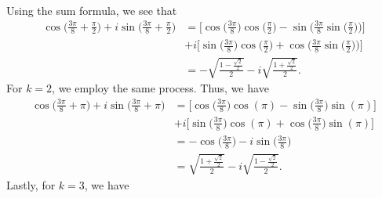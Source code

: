 \documentclass[a4paper]{article}
\begin{document}
\begin{enumerate}
\begin{solution}
\begin{align*}
                \end{align*}
                Using the sum formula, we see that 
                \begin{align*}
                    \cos \Big(  \frac{ 3 \pi  }{ 8  } + \frac{ \pi }{ 2 }  \Big) + i \sin \Big(  \frac{ 3 \pi }{ 8 }  + \frac{ \pi }{ 2 }  \Big) &= \Big[ \cos \Big(  \frac{ 3 \pi  }{ 8 }  \Big) \cos \Big(  \frac{  \pi  }{  2  }  \Big) - \sin \Big(  \frac{ 3 \pi  }{ 8  }  \sin \Big(  \frac{ \pi }{ 2 }  \Big) \Big)\Big]   \\
                                                                                                                                                 &+ i \Big[ \sin \Big(  \frac{ 3 \pi  }{ 8 }  \Big) \cos \Big(  \frac{  \pi  }{ 2 }  \Big) + \cos \Big(  \frac{  3 \pi  }{ 8  }  \sin \Big(  \frac{ \pi }{ 2 }  \Big) \Big) \Big] \\
                                                                                                                                                 &= - \sqrt{  \frac{ 1 - \frac{ \sqrt{ 2 }  }{ 2 }  }{ 2 }  }  - i \sqrt{ \frac{ 1 + \frac{ \sqrt{ 2 }  }{ 2 }  }{ 2 }   }.   
                \end{align*}
                For \( k = 2  \), we employ the same process. Thus, we have
                \begin{align*}
                    \cos \Big( \frac{ 3 \pi  }{ 8 } + \pi    \Big) + i \sin \Big(  \frac{ 3 \pi  }{ 8 }  + \pi \Big) &= \Big[ \cos \Big(  \frac{ 3 \pi  }{ 8  }  \Big) \cos (\pi) - \sin \Big(  \frac{  3 \pi  }{ 8 }  \Big) \sin (\pi)]     \\
                                                                                                                     &+ i \Big[ \sin \Big(  \frac{ 3 \pi }{ 8  }  \Big) \cos (\pi) + \cos \Big(  \frac{ 3 \pi  }{ 8 }  \Big) \sin (\pi)\Big] \\ 
                                                                                                                     &= - \cos \Big(  \frac{ 3 \pi  }{ 8  }  \Big) - i \sin \Big(  \frac{ 3 \pi  }{ 8  }  \Big) \\
                                                                                                                     &= \sqrt{ \frac{ 1 + \frac{ \sqrt{ 2 }  }{ 2 }  }{ 2 }  }  - i \sqrt{ \frac{ 1 - \frac{ \sqrt{ 2 }  }{ 2 }   }{ 2 }  }.
                \end{align*}
                Lastly, for \( k = 3  \), we have
                \begin{align*}

\end{align*}
\end{solution}
\end{enumerate}
\end{document}
